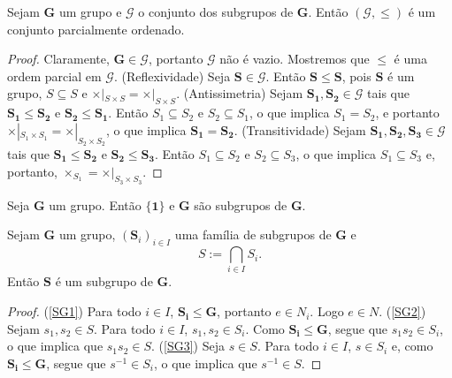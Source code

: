\begin{proposition}
Sejam $\bm G$ um grupo e $\mathcal G$ o conjunto dos subgrupos de $\bm G$. Então $(\mathcal G,\leq)$ é um conjunto parcialmente ordenado.
\end{proposition}
\begin{proof}
Claramente, $\bm G \in \mathcal G$, portanto $\mathcal G$ não é vazio. Mostremos que $\leq$ é uma ordem parcial em $\mathcal G$. (Reflexividade) Seja $\bm S \in \mathcal G$. Então $\bm S \leq \bm S$, pois $\bm S$ é um grupo, $S \subseteq S$ e $\times|_{S \times S} = \times|_{S \times S}$. (Antissimetria) Sejam $\bm{S_1},\bm{S_2} \in \mathcal G$ tais que $\bm{S_1} \leq \bm{S_2}$ e $\bm{S_2} \leq \bm{S_1}$. Então $S_1 \subseteq S_2$ e $S_2 \subseteq S_1$, o que implica $S_1=S_2$, e portanto $\times|_{S_1 \times S_1} = \times|_{S_2 \times S_2}$, o que implica $\bm{S_1} = \bm{S_2}$. (Transitividade) Sejam  $\bm{S_1},\bm{S_2},\bm{S_3} \in \mathcal G$ tais que $\bm{S_1} \leq \bm{S_2}$ e $\bm{S_2} \leq \bm{S_3}$. Então $S_1 \subseteq S_2$ e $S_2 \subseteq S_3$, o que implica $S_1 \subseteq S_3$ e, portanto, $\times_{S_1} = \times|_{S_3 \times S_3}$.
\end{proof}

\begin{proposition}
\label{alge:prop.subgru.triv}
Seja $\bm G$ um grupo. Então $\bm{\{1\}}$ e $\bm G$ são subgrupos de $\bm G$.
\end{proposition}

\begin{proposition}
\label{alge:prop.subgru.inter}
Sejam $\bm G$ um grupo, $(\bm S_i)_{i \in I}$ uma família de subgrupos de $\bm G$ e
	\begin{equation*}
	S := \bigcap_{i \in I} S_i.
	\end{equation*}
Então $\bm S$ é um subgrupo de $\bm G$.
\end{proposition}
\begin{proof}
(\ref{SG1}) Para todo $i \in I$, $\bm{S_i}\leq \bm G$, portanto $e \in N_i$. Logo $e \in N$. (\ref{SG2}) Sejam $s_1, s_2 \in S$. Para todo $i \in I$, $s_1,s_2 \in S_i$. Como $\bm{S_i} \leq \bm G$, segue que $s_1s_2 \in S_i$, o que implica que $s_1s_2 \in S$. (\ref{SG3}) Seja $s \in S$. Para todo $i \in I$, $s \in S_i$ e, como $\bm{S_i} \leq \bm{G}$, segue que $s^{-1} \in S_i$, o que implica que $s^{-1} \in S$.
\end{proof}

